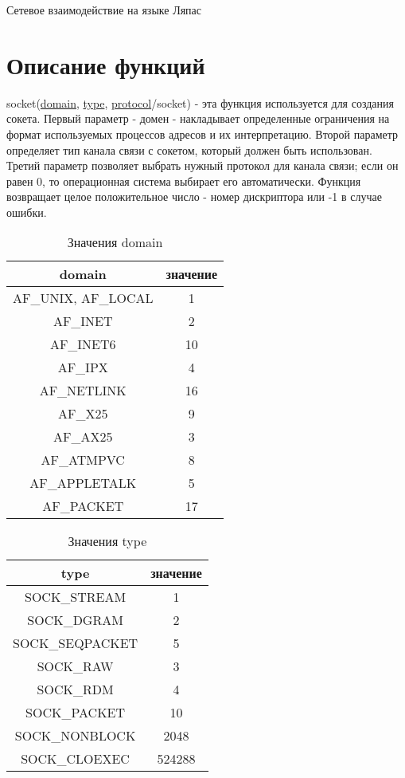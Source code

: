 \documentclass[12t,english,russian]{article}
\begin{document}
\huge
\begin{center}
{Сетевое взаимодействие на языке Ляпас}
\end{center}
\Large
\tableofcontents
\newpage

\large
\section[Описание функций]{Описание функций}
\label{socket}
\hspace{\parindent}
socket(\hyperref[domain]{domain}, \hyperref[type]{type}, \hyperref[protocol]{protocol}/socket) - эта функция используется для создания сокета. Первый параметр - домен - накладывает определенные ограничения на формат используемых процессов адресов и их интерпретацию. Второй параметр определяет тип канала связи с сокетом, который должен быть использован. Третий параметр позволяет выбрать нужный протокол для канала связи; если он равен 0, то операционная система выбирает его автоматически. Функция возвращает целое положительное число - номер дискриптора или -1 в случае ошибки.

\begin{table}[H]
\caption{\label{domain}Значения domain}
\begin{center}
\begin{tabular}{|c|c|}
\hline
domain & значение \\
\hline
AF\_UNIX, AF\_LOCAL & 1 \\
AF\_INET & 2 \\
AF\_INET6 & 10 \\
AF\_IPX & 4 \\
AF\_NETLINK & 16 \\
AF\_X25 & 9 \\
AF\_AX25 & 3 \\
AF\_ATMPVC & 8 \\
AF\_APPLETALK & 5 \\
AF\_PACKET & 17 \\
\hline
\end{tabular}
\end{center}
\end{table}

\begin{table}[ht]
\caption{\label{type}Значения type}
\begin{center}
\begin{tabular}{|c|c|}
\hline
type & значение \\
\hline
SOCK\_STREAM & 1 \\
SOCK\_DGRAM & 2 \\
SOCK\_SEQPACKET & 5 \\
SOCK\_RAW & 3 \\
SOCK\_RDM & 4 \\
SOCK\_PACKET & 10 \\
SOCK\_NONBLOCK & 2048 \\
SOCK\_CLOEXEC & 524288 \\
\hline
\end{tabular}
\end{center}
\end{table}
\end{document}
